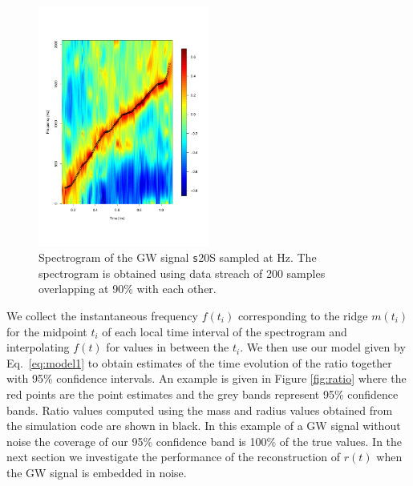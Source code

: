\begin{figure}
 \centering
 \includegraphics[width=0.5\textwidth,height=0.3\textheight]{plots/spectrogram}
 \caption{Spectrogram of the GW signal {\texttt s20S} sampled at \unit[4096]{Hz}.
   The spectrogram is obtained using data streach of 200 samples overlapping at 90\%
   with each other. } \label{fig:spectrogram}
\end{figure}

We collect the instantaneous frequency $f(t_i)$ corresponding to the ridge $m(t_i)$ for
the midpoint $t_i$ of each local time interval of the spectrogram and interpolating $f(t)$
for values in between the $t_i$. We then use our model given by Eq.~\eqref{eq:model1} to obtain
estimates of the time evolution of the ratio together with 95\% confidence intervals.
An example is given in Figure \ref{fig:ratio} where the red points are the point estimates and
the grey bands represent 95\% confidence bands. Ratio values
computed using the mass and radius values obtained from the simulation code 
are shown in black.
In this example of a GW signal without noise the coverage of our 95\% confidence band is 100\%
of the true values.
In the next section we investigate the performance of the reconstruction of $r(t)$ when the GW
signal is embedded in noise.

